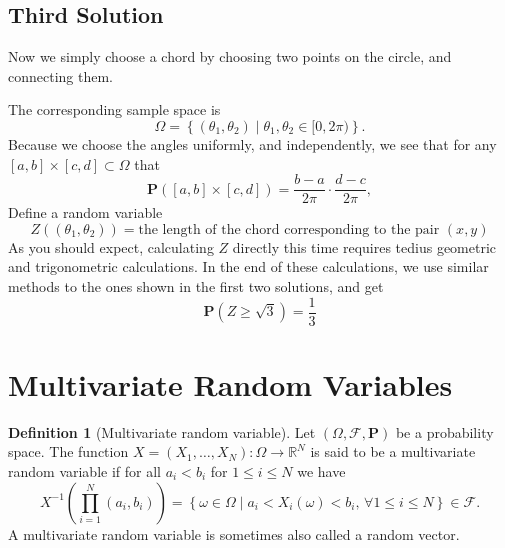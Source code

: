 \documentclass[11pt,a4paper]{article}
\theoremstyle{definition}
\newtheorem{definition}{Definition}[section]
\theoremstyle{plain}
\newcommand{\R}{\mathbb{R}}
\newcommand{\set}[2]{ \left\{ #1 \mid #2 \right\} }
\begin{document}
  \subsection{Third Solution}
    Now we simply choose a chord by choosing two points on the circle, and
    connecting them.
    \begin{center}
    \end{center}
    The corresponding sample space is
    \[
      \Omega = \set{(\theta_1, \theta_2)}{\theta_1, \theta_2 \in [0,2 \pi)}.
    \]
    Because we choose the angles uniformly, and independently,
    we see that for any
    $[a,b] \times [c,d] \subset \Omega$ that
    \[
      \mathbf P([a,b] \times [c,d]) =
      \frac{b-a}{2 \pi} \cdot \frac{d-c}{2 \pi},
    \]
    Define a random variable
    \[
      Z\left((\theta_1, \theta_2)\right) = 
      \text{the length of the chord corresponding to the pair $(x, y)$}
    \]
    As you should expect, calculating $Z$ directly this time requires
    tedius geometric and trigonometric calculations.
    In the end of these calculations, we use similar methods to the ones
    shown in the first two solutions, and get
    \[
      \mathbf P\left(Z \geq \sqrt{3}\right) = 
      \frac{1}{3}
    \]

  \newpage

  \section{Multivariate Random Variables}
  \begin{definition}[Multivariate random variable]
    Let $(\Omega, \mathcal F, \mathbf P)$ be a probability space.
    The function $X = (X_1,\dots,X_N) \colon \Omega \to \R^N$ is said
    to be a multivariate random variable if for all $a_i < b_i$ for 
    $1 \le i \le N$ we have
    \[
      X^{-1}\left(\prod_{i=1}^{N} (a_i, b_i)\right) =
      \set{\omega \in \Omega}
      {a_i < X_i(\omega) < b_i,\, \forall 1 \le i \le N} \in
      \mathcal F.
    \]
    A multivariate random variable is sometimes also called a random vector.
  \end{definition}
  
\end{document}

